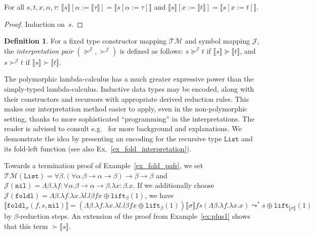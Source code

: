 \documentclass[a4paper,UKenglish,cleveref,autoref,numberwithinsect]{lipics-v2019}
\theoremstyle{definition}
\newtheorem{defn}[theorem]{Definition}
\newcommand{\arrtype}{\rightarrow}
\newcommand{\quant}[2]{\forall #1.#2}
\newcommand{\abs}[2]{\lambda #1.#2}
\newcommand{\tabs}[2]{\Lambda #1.#2}
\newcommand{\lift}{\mathtt{lift}}
\newcommand{\typeinterpret}[1]{\llbracket #1 \rrbracket}
\newcommand{\interpret}[1]{\llbracket #1 \rrbracket}
\newcommand{\Typemap}{\mathcal{T\!M}}
\newcommand{\Termmap}{\mathcal{J}}
\newcommand{\succinterpret}{\succ^{\Termmap}}
\newcommand{\succeqinterpret}{\succeq^{\Termmap}}
\newcommand{\List}{\mathtt{List}}
\newcommand{\nil}{\mathtt{nil}}
\begin{document}
\begin{lemma}\label{lem:substitutioninterpret}
  For all $s,t,x,\alpha,\tau$:
    $\interpret{s}[\alpha:=\typeinterpret{\tau}] =
    \interpret{s[\alpha:=\tau]}$
  and
    $\interpret{s}[x:=\interpret{t}] = \interpret{s[x:=t]}$.
\end{lemma}

\begin{proof}
  Induction on~$s$.
\end{proof}

\begin{defn}
  For a fixed type constructor mapping $\Typemap$ and symbol mapping
  $\Termmap$, the \emph{interpretation pair}
  $(\succeqinterpret,\succinterpret)$ is defined as follows: $s
  \succeqinterpret t$ if $\interpret{s} \succeq \interpret{t}$, and $s
  \succinterpret t$ if $\interpret{s} \succ \interpret{t}$.
\end{defn}

\begin{remark}
The polymorphic lambda-calculus has a much greater expressive power
than the simply-typed lambda-calculus. Inductive data types
may be encoded, along with their constructors and recursors with
appropriate derived reduction rules. This makes
our
interpretation method easier to apply, even in the non-polymorphic
setting, thanks to more
sophisticated ``programming'' in the interpretations.
The reader is advised to consult e.g.~\cite[Chapter~11]{Girard1989}
for more background and explanations. We demonstrate the idea
by presenting an encoding for the recursive type $\List$ and its
fold-left function (see also
Ex.~\ref{ex_fold_interpretation}).
\end{remark}

\begin{example}\label{ex:notyetmono}
Towards a termination proof of Example~\ref{ex_fold_pafs},
we set $\Typemap(\List) = \forall \beta. (\forall \alpha.
\beta \arrtype \alpha \arrtype \beta) \arrtype \beta
\arrtype \beta$ and
$\Termmap(\nil) = \tabs{\beta}{\abs{f:\quant{\alpha}{\beta \arrtype
\alpha \arrtype \beta}}{\abs{x:\beta}{x}}}$.  If we additionally choose
$\Termmap(\mathtt{foldl}) = \tabs{\beta}{\abs{f}{\abs{x}{\abs{l}{l
\beta f x}}} \oplus \lift_\beta(1)}$, we have
$\interpret{\mathtt{foldl}_{\sigma}(f,s,\nil)} = (\tabs{\beta}{
  \abs{f}{\abs{x}{\abs{l}{l \beta f x}}} \oplus \lift_\beta(1)})
  \typeinterpret{\sigma} f s (\tabs{\beta}{\abs{f}{\abs{x}{x}}})
  \leadsto^* s \oplus \lift_{\interpret{\sigma}}(1)$ by
  $\beta$-reduction steps.
An extension of the proof from Example~\ref{ex:plus1} shows that
this term $\succ \interpret{s}$.
\end{example}
\end{document}

